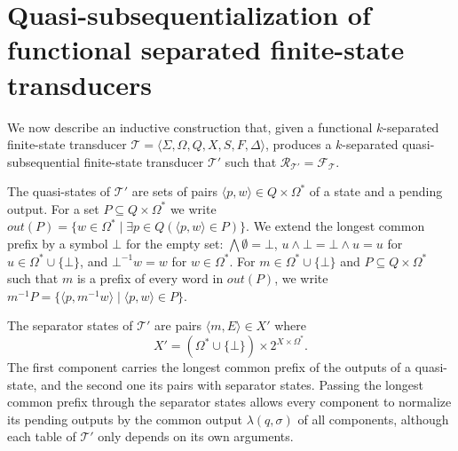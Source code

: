 \section{Quasi-subsequentialization of functional separated finite-state transducers}
\label{section:quasi_subsequentialization}

We now describe an inductive construction that, given a functional $k$-separated
finite-state transducer $\mathcal{T} = \langle \Sigma, \Omega, Q, X, S, F, \Delta
\rangle$, produces a $k$-separated quasi-subsequential finite-state transducer
$\mathcal{T}'$ such that $\mathcal{R}_{\mathcal{T}'} = \mathcal{F}_\mathcal{T}$.

The quasi-states of $\mathcal{T}'$ are sets of pairs $\langle p, w \rangle \in Q
\times \Omega^*$ of a state and a pending output. For a set $P \subseteq Q \times
\Omega^*$ we write $out(P) = \{ w \in \Omega^* \mid \exists p \in Q (\langle p, w
\rangle \in P) \}$. We extend the longest common prefix by a symbol $\bot$ for the
empty set: $\bigwedge \emptyset = \bot$, $u \wedge \bot = \bot \wedge u = u$ for $u \in
\Omega^* \cup \{ \bot \}$, and $\bot^{-1}w = w$ for $w \in \Omega^*$. For $m \in \Omega^*
\cup \{ \bot \}$ and $P \subseteq Q \times \Omega^*$ such that $m$ is a prefix of every
word in $out(P)$, we write $m^{-1}P = \{ \langle p, m^{-1}w \rangle \mid \langle p, w
\rangle \in P \}$.

The separator states of $\mathcal{T}'$ are pairs $\langle m, E \rangle \in X'$ where
\begin{equation*}
  X' = (\Omega^* \cup \{ \bot \}) \times 2^{X \times \Omega^*}.
\end{equation*}
The first component carries the longest common prefix of the outputs of a
quasi-state, and the second one its pairs with separator states. Passing the longest
common prefix through the separator states allows every component to normalize its
pending outputs by the common output $\lambda(q, \sigma)$ of all components, although
each table of $\mathcal{T}'$ only depends on its own arguments.

